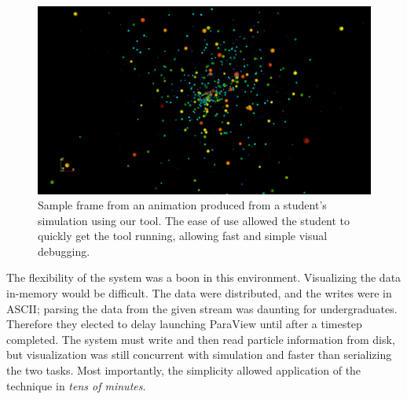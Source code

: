 \begin{figure}
  \centering
  \includegraphics[width=\linewidth]{images/fp/pv-nbody-better}
  \caption{Sample frame from an animation produced from a student's
  simulation using our tool.  The ease of use allowed the student
  to quickly get the tool running, allowing fast and simple visual
  debugging.}
  \label{fig:nbody}
\end{figure}

The flexibility of the system was a boon in this environment.
Visualizing the data in-memory would be difficult. The data were
distributed, and the writes were in ASCII; parsing the data from the
given stream was daunting for undergraduates.  Therefore they elected
to delay launching ParaView until after a timestep completed.  The
system must write and then read particle information from disk, but
visualization was still concurrent with simulation and faster than
serializing the two tasks.  Most importantly, the simplicity allowed
application of the technique in
\textit{tens of minutes}.

% 
%
%
%
%
%
%

